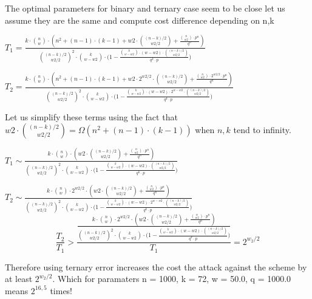 \documentclass[12pt]{article}
\begin{document}
The optimal parameters for binary and ternary case seem to be close let us assume they are the same and compute cost difference depending on n,k


$T_1 = \frac{ k \cdot  \binom{n}{w} \cdot  (n^2 + (n-1)\cdot (k-1) + w2\cdot \binom{(n-k)/2}{w2/2} + \frac{\binom{n}{w2}\cdot p^n}{q^n})}{\binom{(n-k)/2}{w2/2}^2 \cdot  \binom{k}{w-w2} \cdot  \big( 1 - \frac{\binom{k}{w-w2} \cdot  (w-w2) \cdot  \binom{(n-k)/2}{w2/2} }{ q^{k}\cdot p } \big)}$


$T_2 = \frac{ k \cdot  \binom{n}{w} \cdot  (n^2 + (n-1)\cdot (k-1) + w2\cdot 2^{w2/2}\cdot \binom{(n-k)/2}{w2/2} + \frac{\binom{n}{w2}\cdot 2^{w2/2}\cdot p^n}{q^n})}{\binom{(n-k)/2}{w2/2}^2 \cdot  \binom{k}{w-w2} \cdot  \big( 1 - \frac{\binom{k}{w-w2} \cdot  (w-w2) \cdot  2^{w-w2} \cdot  \binom{(n-k)/2}{w2/2} }{ q^{k}\cdot p } \big)}$

Let us simplify these terms using the fact that $w2\cdot \binom{(n-k)/2}{w2/2} = \Omega(n^2 + (n-1)\cdot (k-1))$ when $n,k$ tend to infinity.

$T_1 \sim \frac{ k \cdot  \binom{n}{w} \cdot  (w2\cdot \binom{(n-k)/2}{w2/2} + \frac{\binom{n}{w2}\cdot p^n}{q^n})}{\binom{(n-k)/2}{w2/2}^2 \cdot  \binom{k}{w-w2} \cdot  \big( 1 - \frac{\binom{k}{w-w2} \cdot  (w-w2) \cdot  \binom{(n-k)/2}{w2/2} }{ q^{k}\cdot p } \big)}$


$T_2 \sim \frac{ k \cdot  \binom{n}{w} \cdot  2^{w2/2} \cdot  (w2\cdot \binom{(n-k)/2}{w2/2} + \frac{\binom{n}{w2}\cdot p^n}{q^n})}{\binom{(n-k)/2}{w2/2}^2 \cdot  \binom{k}{w-w2} \cdot  \big( 1 - \frac{\binom{k}{w-w2} \cdot  (w-w2) \cdot  2^{w-w2} \cdot  \binom{(n-k)/2}{w2/2} }{ q^{k}\cdot p } \big)}$
\[
    \frac{T_2}{T_1} > \frac{\frac{ k \cdot  \binom{n}{w} \cdot  2^{w2/2} \cdot  (w2\cdot \binom{(n-k)/2}{w2/2} + \frac{\binom{n}{w2}\cdot p^n}{q^n})}{\binom{(n-k)/2}{w2/2}^2 \cdot  \binom{k}{w-w2} \cdot  \big( 1 - \frac{\binom{k}{w-w2} \cdot  (w-w2) \cdot  \binom{(n-k)/2}{w2/2} }{ q^{k}\cdot p } \big)}}{T_1} = 2^{w_2/2}
\]

Therefore using ternary error increases the cost the attack against the scheme by at least $2^{w_2/2}$. Which for paramaters n = 1000, k = 72, w = 50.0, q = 1000.0 means $2^{16,5}$ times!
\end{document}

